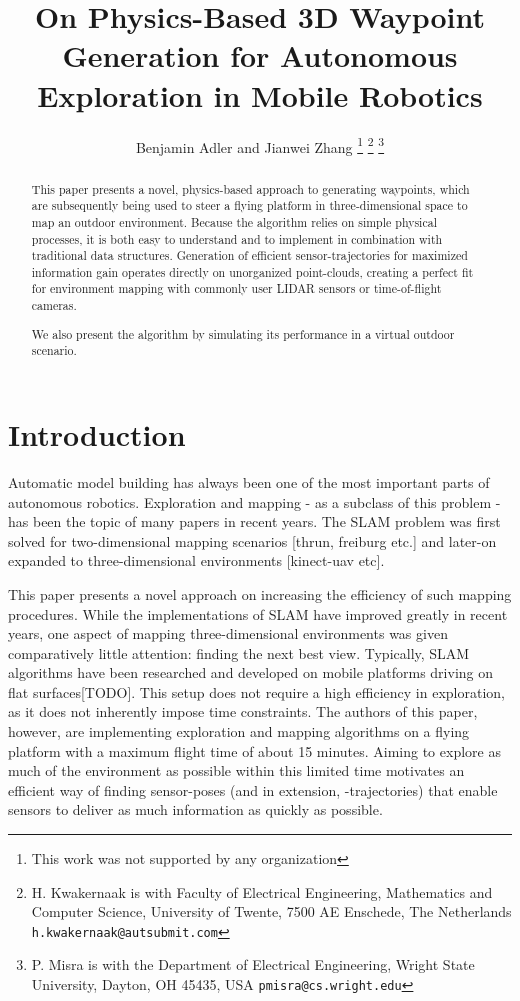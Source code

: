 \documentclass[a4paper, 10pt, conference]{ieeeconf}        %
\title{\LARGE \bf
On Physics-Based 3D Waypoint Generation for Autonomous Exploration in Mobile Robotics
}
\author{Benjamin Adler and Jianwei Zhang%
\thanks{This work was not supported by any organization}%
\thanks{H. Kwakernaak is with Faculty of Electrical Engineering, Mathematics and Computer Science,
        University of Twente, 7500 AE Enschede, The Netherlands
        {\tt\small h.kwakernaak@autsubmit.com}}%
\thanks{P. Misra is with the Department of Electrical Engineering, Wright State University,
        Dayton, OH 45435, USA
        {\tt\small pmisra@cs.wright.edu}}%
}
\begin{document}
\maketitle
\thispagestyle{empty}
\pagestyle{empty}



\begin{abstract}

This paper presents a novel, physics-based approach to generating waypoints, which are subsequently being used to steer a flying platform in three-dimensional space to map an outdoor environment. Because the algorithm relies on simple physical processes, it is both easy to understand and to implement in combination with traditional data structures. Generation of efficient sensor-trajectories for maximized information gain operates directly on unorganized point-clouds, creating a perfect fit for environment mapping with commonly user LIDAR sensors or time-of-flight cameras.

We also present the algorithm by simulating its performance in a virtual outdoor scenario.

\end{abstract}



\section{Introduction}

Automatic model building has always been one of the most important parts of autonomous robotics. Exploration and mapping - as a subclass of this problem - has been the topic of many papers in recent years. The SLAM problem was first solved for two-dimensional mapping scenarios [thrun, freiburg etc.] and later-on expanded to three-dimensional environments [kinect-uav etc].

This paper presents a novel approach on increasing the efficiency of such mapping procedures. While the implementations of SLAM have improved greatly in recent years, one aspect of mapping three-dimensional environments was given comparatively little attention: finding the next best view. Typically, SLAM algorithms have been researched and developed on mobile platforms driving on flat surfaces[TODO]. This setup does not require a high efficiency in exploration, as it does not inherently impose time constraints. The authors of this paper, however, are implementing exploration and mapping algorithms on a flying platform with a maximum flight time of about 15 minutes. Aiming to explore as much of the environment as possible within this limited time motivates an efficient way of finding sensor-poses (and in extension, -trajectories) that enable sensors to deliver as much information as quickly as possible.
\end{document}
